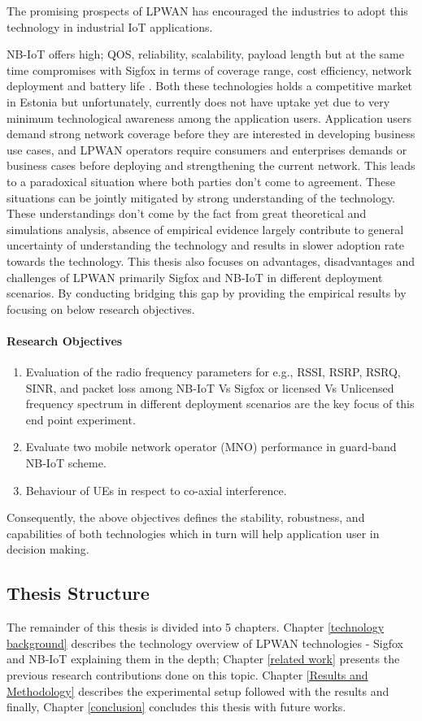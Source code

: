 \documentclass[12pt]{article}
\begin{document}
The promising prospects of LPWAN has encouraged the industries to adopt this technology in industrial IoT applications. \par
NB-IoT offers high; QOS, reliability, scalability, payload length but at the same time compromises with Sigfox in terms of coverage range, cost efficiency, network deployment and battery life \cite{mekki2019comparative}. Both these technologies holds a competitive market in Estonia but unfortunately, currently does not have uptake yet due to very minimum technological awareness among the application users. Application users demand strong network coverage before they are interested in developing business use cases, and LPWAN operators require consumers and enterprises demands or business cases before deploying and strengthening the current network. This leads to a paradoxical situation where both parties don't come to agreement. These situations can be jointly mitigated by strong understanding of the technology. These understandings don't come by the fact from great theoretical and simulations analysis, absence of empirical evidence largely contribute to general uncertainty of understanding the technology and results in slower adoption rate towards the technology. This thesis also focuses on advantages, disadvantages and challenges of LPWAN primarily Sigfox and NB-IoT in different deployment scenarios. By conducting bridging this gap by providing the empirical results by focusing on below research objectives. 
\renewcommand{\labelenumi}{\roman{enumi}}
\paragraph{Research Objectives}
\begin{enumerate}
    \item Evaluation of the radio frequency parameters for e.g., RSSI, RSRP, RSRQ, SINR, and packet loss among NB-IoT Vs Sigfox or licensed Vs Unlicensed frequency spectrum in different deployment scenarios are the key focus of this end point experiment.
    \item Evaluate two mobile network operator (MNO) performance in guard-band NB-IoT scheme.
    \item Behaviour of UEs in respect to co-axial interference.
\end{enumerate}
 Consequently, the above objectives defines the stability, robustness, and capabilities of both technologies which in turn will help application user in decision making.
\subsection{Thesis Structure}
The remainder of this thesis is divided into 5 chapters. Chapter \ref{technology background} describes the technology overview of LPWAN technologies - Sigfox and NB-IoT explaining them in the depth; Chapter \ref{related work} presents the previous research contributions done on this topic. Chapter \ref{Results and Methodology} describes the experimental setup followed with the results and finally, Chapter \ref{conclusion} concludes this thesis with future works.
\end{document}
